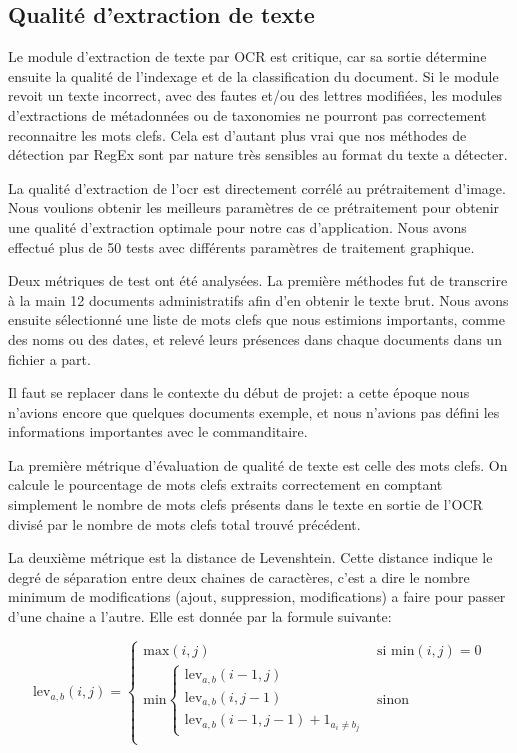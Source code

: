 \subsection{Qualité d'extraction de texte}\label{testOCR}
Le module d'extraction de texte par OCR est critique, car sa sortie détermine ensuite la qualité de l'indexage et de la classification du document.
Si le module revoit un texte incorrect, avec des fautes et/ou des lettres modifiées, les modules d'extractions de métadonnées ou de taxonomies ne pourront pas correctement reconnaitre les mots clefs.
Cela est d'autant plus vrai que nos méthodes de détection par RegEx sont par nature très sensibles au format du texte a détecter.


La qualité d'extraction de l'\gls{ocr} est directement corrélé au prétraitement d'image.
Nous voulions obtenir les meilleurs paramètres de ce prétraitement pour obtenir une qualité d'extraction optimale pour notre cas d'application.
Nous avons effectué plus de 50 tests avec différents paramètres de traitement graphique.

Deux métriques de test ont été analysées.
La première méthodes fut de transcrire à la main 12 documents administratifs afin d'en obtenir le texte brut.
Nous avons ensuite sélectionné une liste de mots clefs que nous estimions importants, comme des noms ou des dates, et relevé leurs présences dans chaque documents dans un fichier a part.

Il faut se replacer dans le contexte du début de projet: a cette époque nous n'avions encore que quelques documents exemple, et nous n'avions pas défini les informations importantes avec le commanditaire.


La première métrique d'évaluation de qualité de texte est celle des mots clefs.
On calcule le pourcentage de mots clefs extraits correctement en comptant simplement le nombre de mots clefs présents dans le texte en sortie de l'OCR divisé par le nombre de mots clefs total trouvé précédent. 


La deuxième métrique est la distance de Levenshtein.
Cette distance indique le degré de séparation entre deux chaines de caractères, c'est a dire le nombre minimum de modifications (ajout, suppression, modifications) a faire pour passer d'une chaine a l'autre. Elle est donnée par la formule suivante:

\begin{equation}
	\text{lev}_{a,b}(i,j) = \left\{\begin{matrix}
		\text{max}(i,j) & \text{si min}(i,j) = 0 \\ 
		\text{min}\left\{\begin{matrix}
			\text{lev}_{a,b}(i-1,j)\\ 
			\text{lev}_{a,b}(i,j-1)\\ 
			\text{lev}_{a,b}(i-1,j-1)+1_{a_i \neq b_j}
		\end{matrix}\right. & \text{sinon} \\ 
	\end{matrix}\right.
\end{equation}

